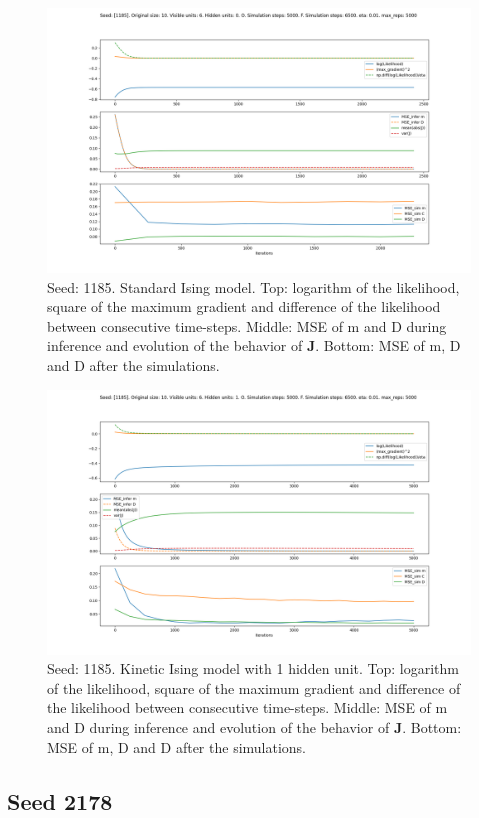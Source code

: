 \documentclass{article}
\def\*#1{\mathbf{#1}}
\begin{document}
\begin{figure}[!htb]
    \centering
    \includegraphics[width=0.7\linewidth]{images/sqrt_size/[1185]_10_6_0_5000_6500_eta001_5000_100.png}
\caption{Seed: 1185. Standard Ising model. Top: logarithm of the likelihood, square of the maximum gradient and difference of the likelihood between consecutive time-steps. Middle: MSE of m and D during inference and evolution of the behavior of $\*J$. Bottom: MSE of m, D and D after the simulations.}
\end{figure}


\begin{figure}[!htb]
    \centering
    \includegraphics[width=0.7\linewidth]{images/sqrt_size/[1185]_10_6_1_5000_6500_eta001_5000_100.png}
\caption{Seed: 1185. Kinetic Ising model with 1 hidden unit. Top: logarithm of the likelihood, square of the maximum gradient and difference of the likelihood between consecutive time-steps. Middle: MSE of m and D during inference and evolution of the behavior of $\*J$. Bottom: MSE of m, D and D after the simulations.}
\end{figure}


\newpage
\subsection{Seed 2178}
\end{document}

